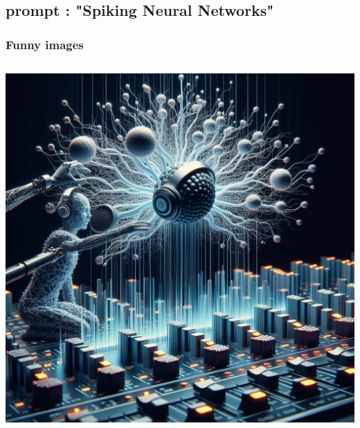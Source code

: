 \documentclass[aspectratio=169, 11pt]{beamer}
\begin{document}
\subsection*{prompt : "Spiking Neural Networks"}

\begin{frame}
  \frametitle{Funny images}

  \begin{columns}
    \begin{column}{0.5\textwidth} %
      \includegraphics[width=\textwidth]{image/2.jpeg}
    \end{column}


\end{columns}
\end{frame}
\end{document}
